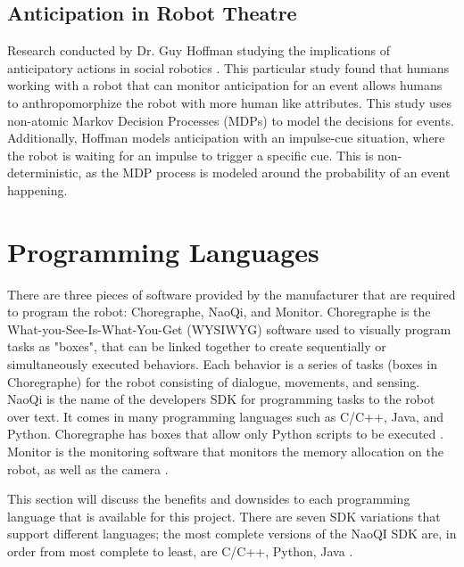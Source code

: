 \documentclass[onecolumn, draftclsnofoot,10pt, compsoc]{IEEEtran}
\begin{document}
  \subsection{Anticipation in Robot Theatre}
  Research conducted by Dr. Guy Hoffman studying the implications of anticipatory actions in social robotics \cite{hoffman2010anticipation}. This particular study found that humans working with a robot that can monitor anticipation for an event allows humans to anthropomorphize the robot with more human like attributes. This study uses non-atomic Markov Decision Processes (MDPs) to model the decisions for events. Additionally, Hoffman models anticipation with an impulse-cue situation, where the robot is waiting for an impulse to trigger a specific cue. This is non-deterministic, as the MDP process is modeled around the probability of an event happening.

\section{Programming Languages}

  There are three pieces of software provided by the manufacturer that are required to program the robot: Choregraphe, NaoQi, and Monitor. Choregraphe is the What-you-See-Is-What-You-Get (WYSIWYG) software used to visually program tasks as "boxes", that can be linked together to create sequentially or simultaneously executed behaviors. Each behavior is a series of tasks (boxes in Choregraphe) for the robot consisting of dialogue, movements, and sensing. NaoQi is the name of the developers SDK for programming tasks to the robot over text. It comes in many programming languages such as C/C++, Java, and Python. Choregraphe has boxes that allow only Python scripts to be executed \cite{programmingLanguages}. Monitor is the monitoring software that monitors the memory allocation on the robot, as well as the camera \cite{monitor}.

  This section will discuss the benefits and downsides to each programming language that is available for this project. There are seven SDK variations that support different languages; the most complete versions of the NaoQI SDK are, in order from most complete to least, are C/C++, Python, Java \cite{programmingLanguages}.  
 
\end{document}
